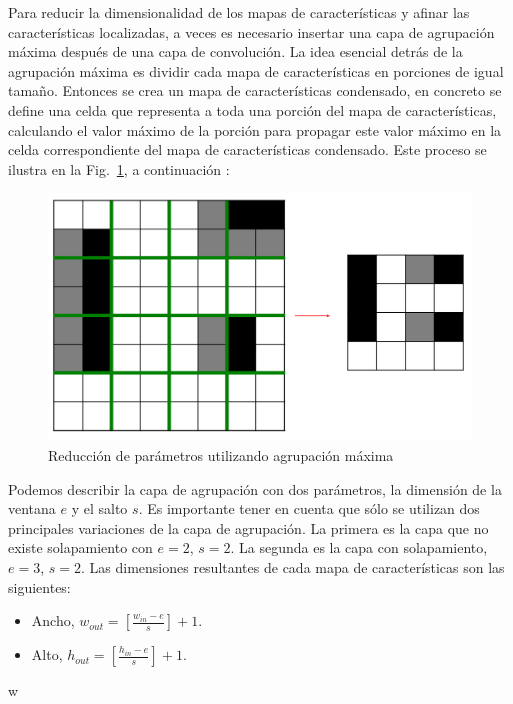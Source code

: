     Para reducir la dimensionalidad de los mapas de características y afinar las características localizadas, a veces es necesario insertar una capa de agrupación máxima después de una capa de convolución. La idea esencial detrás de la agrupación máxima es dividir cada mapa de características en porciones de igual tamaño. Entonces se crea un mapa de características condensado, en concreto se define una celda que representa a toda una porción del mapa de características, calculando el valor máximo de la porción para propagar este valor máximo en la celda correspondiente del mapa de características condensado. Este proceso se ilustra en la Fig.~\ref{fig:max_pooling}, a continuación \cite{dlBook}:
	\begin{figure}[htp]
        \centering
        \includegraphics[scale=0.4]{chapter3/max_pooling.png}
        \caption{Reducción de parámetros utilizando agrupación máxima}
        \label{fig:max_pooling}
    \end{figure}

    Podemos describir la capa de agrupación con dos parámetros, la dimensión de la ventana $e$ y el salto $s$. Es importante tener en cuenta que sólo se utilizan dos principales variaciones de la capa de agrupación. La primera es la capa que no existe solapamiento con $e=2$, $s=2$. La segunda es la capa con solapamiento, $e=3$, $s=2$. Las dimensiones resultantes de cada mapa de características son las siguientes:

    \begin{itemize}
		\item Ancho, $w_{out}=\left[\frac{w_{in}-e}{s}\right]+1$.
		\item Alto, $h_{out}=\left[\frac{h_{in}-e}{s}\right]+1$.
	\end{itemize}w
	

